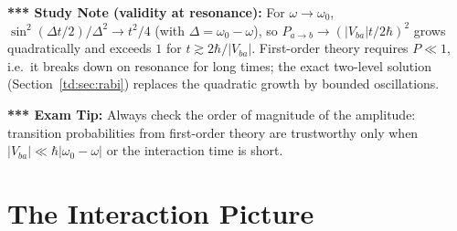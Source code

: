 \documentclass[11pt,a4paper]{article}
\begin{document}
\textbf{*** Study Note (validity at resonance):} For $\omega\to\omega_0$, $\sin^2(\Delta t/2)/\Delta^2\to t^2/4$ (with $\Delta=\omega_0-\omega$), so $P_{a\to b}\to(|V_{ba}|t/2\hbar)^2$ grows quadratically and exceeds $1$ for $t\gtrsim2\hbar/|V_{ba}|$. First-order theory requires $P\ll1$, i.e.\ it breaks down on resonance for long times; the exact two-level solution (Section~\ref{td:sec:rabi}) replaces the quadratic growth by bounded oscillations.

\textbf{*** Exam Tip:} Always check the order of magnitude of the amplitude: transition probabilities from first-order theory are trustworthy only when $|V_{ba}|\ll\hbar|\omega_0-\omega|$ or the interaction time is short.
\section{The Interaction Picture}
\end{document}
